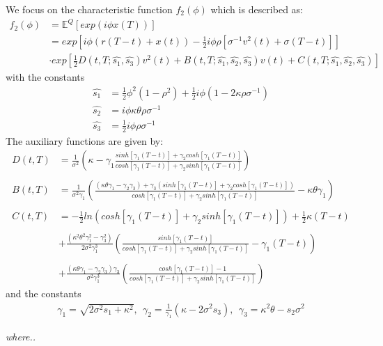 \documentclass[a4paper,11pt]{article}
\begin{document}
We focus on the characteristic function $f_2(\phi)$ which is described as:
\begin{align*}
f_2(\phi)&=\mathbb{E}^Q[exp(i \phi x(T))] \\
&= exp[i\phi(r(T-t)+x(t)) -\frac{1}{2}i\phi\rho[\sigma^{-1}v^2(t)+\sigma(T-t)]] \\
&\cdot exp[\frac{1}{2}D(t,T;\hat{s_1},\hat{s_3})v^2(t) +B(t,T;\hat{s_1},
\hat{s_2},\hat{s_3})v(t)+C(t,T;\hat{s_1},\hat{s_2},\hat{s_3})]
\end{align*} 
with the constants 
\begin{align*}
\hat{s_1} &= \frac{1}{2} \phi^2 (1-\rho^2)+ \frac{1}{2} i \phi(1-2\kappa\rho\sigma^{-1}) \\
\hat{s_2} &= i\phi\kappa\theta\rho\sigma^{-1
} \\
\hat{s_3} &= \frac{1}{2} i\phi\rho\sigma^{-1}
\end{align*}
The auxiliary functions are given by:
\begin{align*}
D(t,T)&=\frac{1}{\sigma^2}\left(\kappa - \gamma_1 \frac{sinh[\gamma_1(T-t)]+\gamma_2 cosh[\gamma_1(T-t)]}{cosh[\gamma_1(T-t)]+\gamma_2 sinh[\gamma_1(T-t)]}\right) \\ \\
B(t,T) &= \frac{1}{\sigma^2\gamma_1} \left(\frac{(\kappa\theta\gamma_1-\gamma_2 \gamma_3)+ \gamma_3(sinh[\gamma_1(T-t)] + \gamma_2 cosh[\gamma_1(T-t)])}{cosh[\gamma_1(T-t)] + \gamma_2 sinh[\gamma_1(T-t)]}-\kappa\theta\gamma_1 \right) \\ \\
C(t,T)&= -\frac{1}{2} ln(cosh[\gamma_1(T-t)] +\gamma_2 sinh[\gamma_1(T-t)])+\frac{1}{2}\kappa(T-t) \\ \\
&+ \frac{(\kappa^2\theta^2\gamma_1^{2} - \gamma_3^{2})}{2\sigma^2\gamma_1^{3}}\left(\frac{sinh[\gamma_1(T-t)]}{cosh[\gamma_1(T-t)]+\gamma_2sinh[\gamma_1(T-t)]}-\gamma_1(T-t)\right) \\ \\
&+ \frac{(\kappa\theta\gamma_1-\gamma_2\gamma_3)\gamma_3}{\sigma^2\gamma_1^{3}}\left(\frac{cosh[\gamma_1(T-t)]-1}{cosh[\gamma_1(T-t)]+\gamma_2 sinh[\gamma_1(T-t)]}\right)
\end{align*}
and the constants
\begin{align*}
\gamma_1=\sqrt{2\sigma^2s_1+\kappa^2}, \  \  \gamma_2=\frac{1}{\gamma_1}(\kappa-2\sigma^2s_3), \ \ \gamma_3=\kappa^2\theta-s_2\sigma^2
\end{align*}

\textit{
where..}
\end{document}
